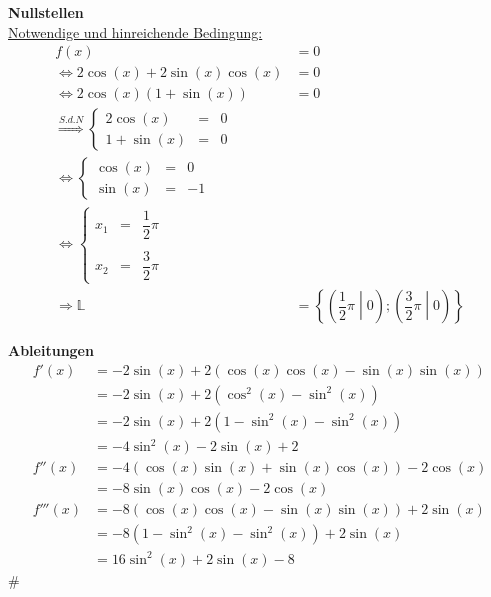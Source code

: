\begin{minipage}[t]{0.5\textwidth}
  \textbf{Nullstellen}\\
  \underline{Notwendige und hinreichende Bedingung:}\\
  \begin{align*}
    f(x)                                        &=0\\
    \Leftrightarrow 2\cos(x)+2\sin(x)\cos(x)    &=0\\
    \Leftrightarrow 2\cos(x)(1+\sin(x))         &=0\\
    \stackrel{S.d.N}{\Rightarrow}
    \left\{\begin{array}{rccl}
      2\cos(x)  &=  &0  & \\
      1+\sin(x) &=  &0  &
    \end{array} \\
    \Leftrightarrow
    \left\{ \begin{array}{rccl}
      \cos(x) & = & 0 \\
      \sin(x) & = & -1
    \end{array} \\
    \Leftrightarrow
    \left\{ \begin{array}{rccl}
      x_1&=&\dfrac{1}{2}\pi&  \\\\
      x_2&=&\dfrac{3}{2}\pi&
    \end{array} \\
    \Rightarrow \mathbb{L} &= \left \{ \left( \dfrac{1}{2} \pi \middle| 0 \right) ; \left( \dfrac{3}{2} \pi \middle| 0 \right) \right\}
  \end{align*}
\end{minipage}
\vline
\begin{minipage}[t]{0.5\textwidth}
  \textbf{Ableitungen}\\
    \begin{align*}
      f'(x)&=-2\sin(x)+2(\cos(x)\cos(x)-\sin(x)\sin(x))\\
      &=-2\sin(x)+2(\cos^2(x)-\sin^2(x))\\
      &=-2\sin(x)+2(1-\sin^2(x)-\sin^2(x))\\
      &=-4\sin^2(x)-2\sin(x)+2\\
      f''(x)&=-4(\cos(x)\sin(x)+\sin(x)\cos(x))-2\cos(x)\\
      &=-8\sin(x)\cos(x)-2\cos(x)\\
      f'''(x)&=-8(\cos(x)\cos(x)-\sin(x)\sin(x))+2\sin(x)\\
      &=-8(1-\sin^2(x)-\sin^2(x))+2\sin(x)\\
      &=16\sin^2(x)+2\sin(x)-8
    \end{align*}#
\end{minipage}
\\\\


